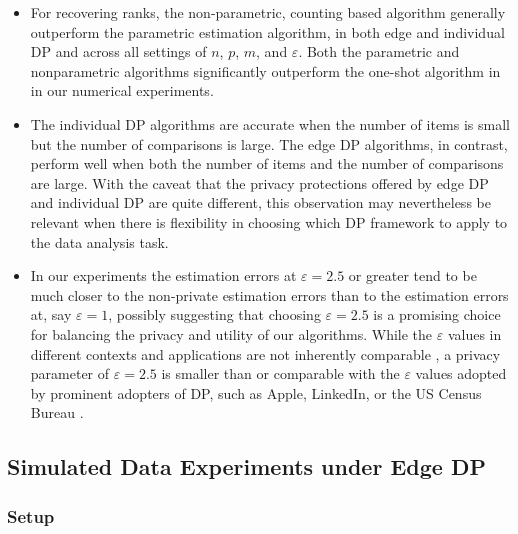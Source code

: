 \documentclass[letterpaper,12pt]{article}
\numberwithin{equation}{section}
\theoremstyle{plain}
\numberwithin{Theorem}{section}
\numberwithin{corollary}{section}
\numberwithin{proposition}{section}
\numberwithin{Lemma}{section}
{
	\theoremstyle{definition}
	\newtheorem{Definition}{Definition}
	\newtheorem{example}{Example}
	\numberwithin{example}{section}
	\newtheorem{fact}{Fact}
	\numberwithin{fact}{section}
	\newtheorem{remark}{Remark}
}
\newcommand{\1}{\mathbbm{1}}
\begin{document}
\begin{itemize}
	\item For recovering ranks, the non-parametric, counting based algorithm generally outperform the parametric estimation algorithm, in both edge and individual DP and across all settings of $n$, $p$, $m$, and $\varepsilon$. Both the parametric and nonparametric algorithms significantly outperform the one-shot algorithm in \cite{qiao2021oneshot} in our numerical experiments.
	
	\item The individual DP algorithms are accurate when the number of items is small but the number of comparisons is large. The edge DP algorithms, in contrast, perform well when both the number of items and the number of comparisons are large. With the caveat that the privacy protections offered by edge DP  and individual DP are quite different, this observation may nevertheless be relevant when there is flexibility in choosing which DP framework to apply to the data analysis task.
	
	\item In our experiments the estimation errors at $\varepsilon = 2.5$ or greater tend to be much closer to the non-private estimation errors than to the estimation errors at, say $\varepsilon = 1$, possibly suggesting that choosing $\varepsilon = 2.5$ is a promising choice for balancing the privacy and utility of our algorithms. While the $\varepsilon$ values in different contexts and applications are not inherently comparable \cite{NBERc15017}, a privacy parameter of $\varepsilon = 2.5$ is smaller than or comparable with the $\varepsilon$ values adopted by prominent adopters of DP, such as Apple, LinkedIn, or the US Census Bureau \cite{desfontainesblog20211001}.
	
	
\end{itemize}

\vspace{-5mm}
\subsection{Simulated Data Experiments under Edge DP}
\label{sec: edge dp simulated data}

\subsubsection{Setup}
\end{document}
